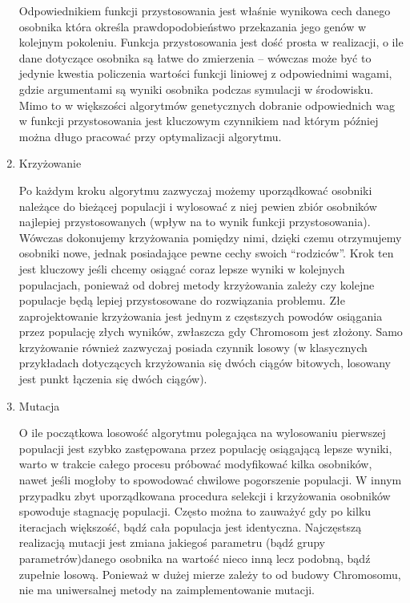 \begin{par}
\begin{enumerate}
\begin{par}
		Odpowiednikiem funkcji przystosowania jest właśnie wynikowa cech danego osobnika która określa prawdopodobieństwo przekazania jego genów w kolejnym pokoleniu.
		Funkcja przystosowania jest dość prosta w realizacji, o ile dane dotyczące osobnika są łatwe do zmierzenia -- wówczas może być to jedynie kwestia policzenia wartości funkcji liniowej z odpowiednimi wagami, gdzie argumentami są wyniki osobnika podczas symulacji w środowisku.
		Mimo to w większości algorytmów genetycznych dobranie odpowiednich wag w funkcji przystosowania jest kluczowym czynnikiem nad którym później można długo pracować przy optymalizacji algorytmu.
	\end{par}
\item Krzyżowanie
	\begin{par}
		Po każdym kroku algorytmu zazwyczaj możemy uporządkować osobniki należące do bieżącej populacji i wylosować z niej pewien zbiór osobników najlepiej przystosowanych (wpływ na to wynik funkcji przystosowania). 
		Wówczas dokonujemy krzyżowania pomiędzy nimi, dzięki czemu otrzymujemy osobniki nowe, jednak posiadające pewne cechy swoich ``rodziców''.
		Krok ten jest kluczowy jeśli chcemy osiągać coraz lepsze wyniki w kolejnych populacjach, ponieważ od dobrej metody krzyżowania zależy czy kolejne populacje będą lepiej przystosowane do rozwiązania problemu.
		Złe zaprojektowanie krzyżowania jest jednym z częstszych powodów osiągania przez populację złych wyników, zwłaszcza gdy Chromosom jest złożony.
		Samo krzyżowanie również zazwyczaj posiada czynnik losowy (w klasycznych przykładach dotyczących krzyżowania się dwóch ciągów bitowych, losowany jest punkt łączenia się dwóch ciągów).
	\end{par}
\item Mutacja
	\begin{par}
		O ile początkowa losowość algorytmu polegająca na wylosowaniu pierwszej populacji jest szybko zastępowana przez populację osiągającą lepsze wyniki, 
		warto w trakcie całego procesu próbować modyfikować kilka osobników, nawet jeśli mogłoby to spowodować chwilowe pogorszenie populacji. 
		W innym przypadku zbyt uporządkowana procedura selekcji i krzyżowania osobników spowoduje stagnację populacji.
		Często można to zauważyć gdy po kilku iteracjach większość, bądź cała populacja jest identyczna.
		Najczęstszą realizacją mutacji jest zmiana jakiegoś parametru (bądź grupy parametrów)danego osobnika na wartość nieco inną lecz podobną, bądź zupełnie losową.
		Ponieważ w dużej mierze zależy to od budowy Chromosomu, nie ma uniwersalnej metody na zaimplementowanie mutacji.

\end{par}
\end{enumerate}
\end{par}
